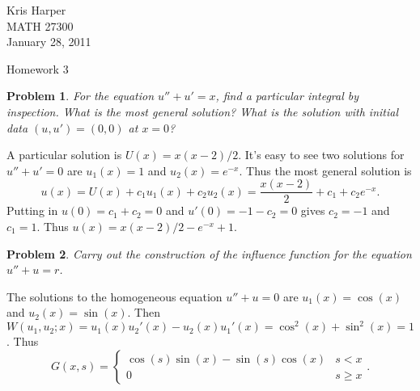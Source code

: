 \documentclass{article}
\newtheorem{problem}{Problem}
\begin{document}
\begin{flushright}
Kris Harper\\

MATH 27300\\

January 28, 2011
\end{flushright}

\begin{center}
Homework 3
\end{center}

\begin{problem}
For the equation $u'' + u' = x$, find a particular integral by inspection. What is the most general solution? What is the solution with initial data $(u, u') = (0,0)$ at $x = 0$?
\end{problem}

A particular solution is $U(x) = x(x-2)/2$. It's easy to see two solutions for $u'' + u' = 0$ are $u_1(x) = 1$ and $u_2(x) = e^{-x}$. Thus the most general solution is
\[
u(x) = U(x) + c_1u_1(x) + c_2u_2(x) = \frac{x(x-2)}{2} + c_1 + c_2e^{-x}.
\]
Putting in $u(0) = c_1 + c_2 = 0$ and $u'(0) = -1 - c_2 = 0$ gives $c_2 = -1$ and $c_1 = 1$. Thus $u(x) = x(x-2)/2 - e^{-x} + 1$.

\begin{problem}
Carry out the construction of the influence function for the equation $u'' + u = r$.
\end{problem}

The solutions to the homogeneous equation $u'' + u = 0$ are $u_1(x) = \cos(x)$ and $u_2(x) = \sin(x)$. Then $W(u_1, u_2; x) = u_1(x)u_2'(x) - u_2(x)u_1'(x) = \cos^2(x) + \sin^2(x) = 1$. Thus
\[
G(x,s) =
\begin{cases}
\cos(s)\sin(x) - \sin(s)\cos(x) & s < x\\
0 & s \geq x
\end{cases}.
\]
\end{document}
